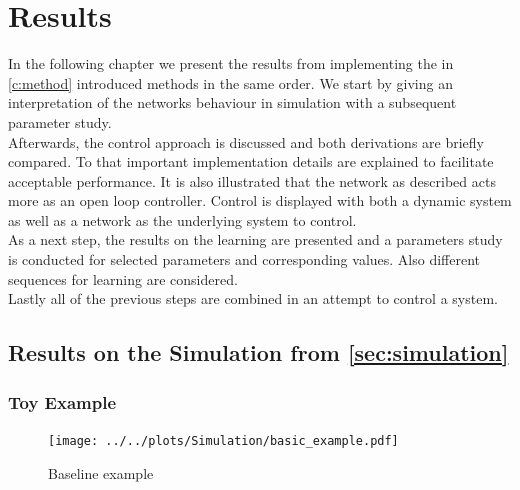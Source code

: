 \chapter{Results}\label{c:results}
In the following chapter we present the results from implementing the in \cref{c:method} introduced methods in the same order. We start by giving an interpretation of the networks behaviour in simulation with a subsequent parameter study.\\
Afterwards, the control approach is discussed and both derivations are briefly compared. To that important implementation details are explained to facilitate acceptable performance. It is also illustrated that the network as described acts more as an open loop controller. Control is displayed with both a dynamic system as well as a network as the underlying system to control.\\
As a next step, the results on the learning are presented and a parameters study is conducted for selected parameters and corresponding values. Also different sequences for learning are considered.\\
Lastly all of the previous steps are combined in an attempt to control a system.

\section{Results on the Simulation from \cref{sec:simulation}}\label{sec:res_simulation}
\subsection{Toy Example}
\begin{figure}[h!]
	\centering
	\centering
	\texttt{[image: ../../plots/Simulation/basic\_example.pdf]}
	\caption{Baseline example}
	\label{fig:sim_res_1}
\end{figure}

